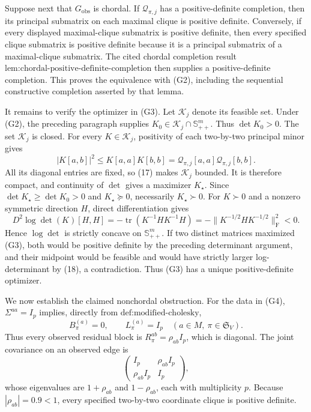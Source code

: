 Suppose next that \(G_{\mathrm{obs}}\) is chordal.  If \(\mathcal Q_{\pi,j}\) has a positive-definite completion, then its principal submatrix on each maximal clique is positive definite.  Conversely, if every displayed maximal-clique submatrix is positive definite, then every specified clique submatrix is positive definite because it is a principal submatrix of a maximal-clique submatrix.  The cited chordal completion result \(\text{lem:chordal-positive-definite-completion}\) then supplies a positive-definite completion.  This proves the equivalence with (G2), including the sequential constructive completion asserted by that lemma.

It remains to verify the optimizer in (G3).  Let \(\mathcal K_j\) denote its feasible set.  Under (G2), the preceding paragraph supplies \(K_0\in\mathcal K_j\cap\mathbb S_{++}^m\).  Thus \(\det K_0>0\).  The set \(\mathcal K_j\) is closed.  For every \(K\in\mathcal K_j\), positivity of each two-by-two principal minor gives
\[
|K[a,b]|^2\le K[a,a]K[b,b]
=\mathcal Q_{\pi,j}[a,a]\mathcal Q_{\pi,j}[b,b].
\tag{17}
\]
All its diagonal entries are fixed, so (17) makes \(\mathcal K_j\) bounded.  It is therefore compact, and continuity of \(\det\) gives a maximizer \(K_\star\).  Since \(\det K_\star\ge\det K_0>0\) and \(K_\star\succeq0\), necessarily \(K_\star\succ0\).  For \(K\succ0\) and a nonzero symmetric direction \(H\), direct differentiation gives
\[
D^2\log\det(K)[H,H]
=-\operatorname{tr}(K^{-1}HK^{-1}H)
=-\lVert K^{-1/2}HK^{-1/2}\rVert_{\mathrm F}^2<0.
\tag{18}
\]
Hence \(\log\det\) is strictly concave on \(\mathbb S_{++}^m\).  If two distinct matrices maximized (G3), both would be positive definite by the preceding determinant argument, and their midpoint would be feasible and would have strictly larger log-determinant by (18), a contradiction.  Thus (G3) has a unique positive-definite optimizer.

We now establish the claimed nonchordal obstruction.  For the data in (G4), \(\Sigma^{aa}=I_p\) implies, directly from \(\text{def:modified-cholesky}\),
\[
B_\pi^{(a)}=0,
\qquad L_\pi^{(a)}=I_p
\quad(a\in M,\ \pi\in\mathfrak S_V).
\tag{19}
\]
Thus every observed residual block is \(R_\pi^{ab}=\rho_{ab}I_p\), which is diagonal.  The joint covariance on an observed edge is
\[
\begin{pmatrix}
I_p&\rho_{ab}I_p\\
\rho_{ab}I_p&I_p
\end{pmatrix},
\tag{20}
\]
whose eigenvalues are \(1+\rho_{ab}\) and \(1-\rho_{ab}\), each with multiplicity \(p\).  Because \(|\rho_{ab}|=0.9<1\), every specified two-by-two coordinate clique is positive definite.

